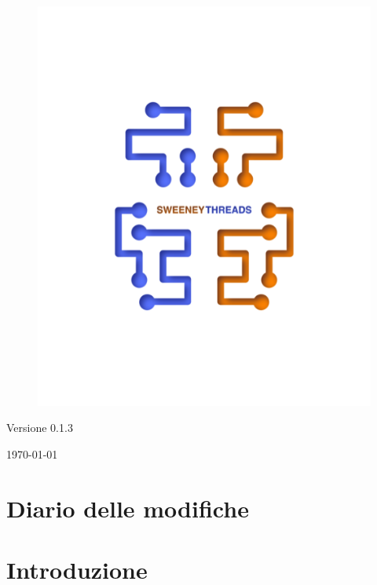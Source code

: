\documentclass[a4paper]{article}
\begin{document}
\begin{titlepage}
		\begin{figure}[H]
			\centering
			\includegraphics[scale=0.8]{sweeney.png}
		\end{figure}
		\begin{center}
			Versione 0.1.3
		\end{center}
		{\large \today}\\[3cm] 
		\vfill  
	\end{titlepage}
	
	
	\tableofcontents
	
	\newpage 
	\section*{Diario delle modifiche}

	\newpage \section{Introduzione}
\end{document}
